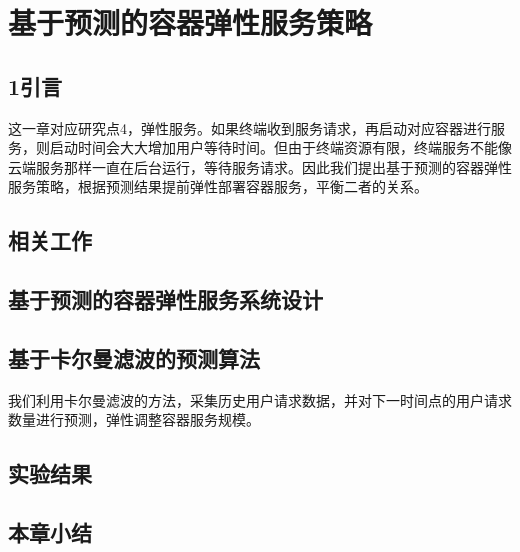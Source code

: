 \chapter{基于预测的容器弹性服务策略 }\label{chap:elastic_service}

\section{1引言}
这一章对应研究点4，弹性服务。如果终端收到服务请求，再启动对应容器进行服务，则启动时间会大大增加用户等待时间。但由于终端资源有限，终端服务不能像云端服务那样一直在后台运行，等待服务请求。因此我们提出基于预测的容器弹性服务策略，根据预测结果提前弹性部署容器服务，平衡二者的关系。
\section{相关工作}
\section{基于预测的容器弹性服务系统设计}
\section{基于卡尔曼滤波的预测算法}
我们利用卡尔曼滤波的方法，采集历史用户请求数据，并对下一时间点的用户请求数量进行预测，弹性调整容器服务规模。
\section{实验结果}
\section{本章小结}